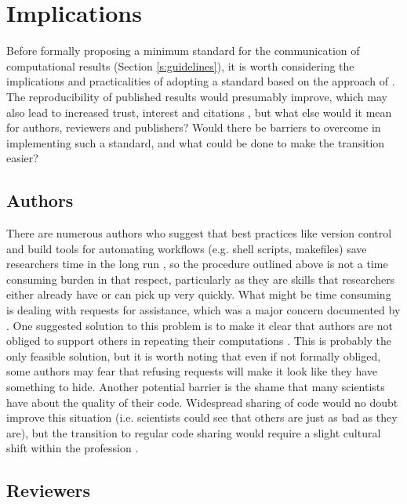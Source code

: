 \section{Implications}

Before formally proposing a minimum standard for the communication of computational results (Section \ref{s:guidelines}), it is worth considering the implications and practicalities of adopting a standard based on the approach of \citet{Irving2015}. The reproducibility of published results would presumably improve, which may also lead to increased trust, interest and citations \citep{Piwowar2007}, but what else would it mean for authors, reviewers and publishers? Would there be barriers to overcome in implementing such a standard, and what could be done to make the transition easier?

\subsection{Authors}

There are numerous authors who suggest that best practices like version control and build tools for automating workflows (e.g. shell scripts, makefiles) save researchers time in the long run \citep[e.g.][]{Sandve2013,Wilson2014a}, so the procedure outlined above is not a time consuming burden in that respect, particularly as they are skills that researchers either already have or can pick up very quickly. What might be time consuming is dealing with requests for assistance, which was a major concern documented by \citet{Stodden2010}. One suggested solution to this problem is to make it clear that authors are not obliged to support others in repeating their computations \citep{Easterbrook2014}. This is probably the only feasible solution, but it is worth noting that even if not formally obliged, some authors may fear that refusing requests will make it look like they have something to hide. Another potential barrier is the shame that many scientists have about the quality of their code. Widespread sharing of code would no doubt improve this situation (i.e. scientists could see that others are just as bad as they are), but the transition to regular code sharing would require a slight cultural shift within the profession \citep{Barnes2010}.

\subsection{Reviewers}

